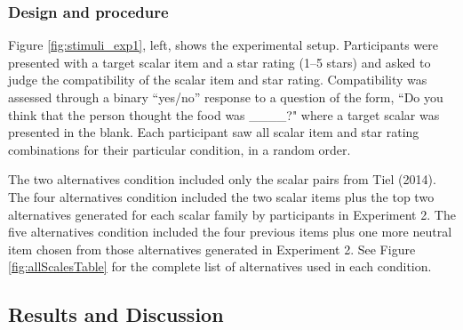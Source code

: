 \documentclass[10pt, letterpaper]{article}
\begin{document}
\subsubsection{Design and procedure}\label{design-and-procedure}

Figure \ref{fig:stimuli_exp1}, left, shows the experimental setup.
Participants were presented with a target scalar item and a star rating
(1--5 stars) and asked to judge the compatibility of the scalar item and
star rating. Compatibility was assessed through a binary ``yes/no''
response to a question of the form, ``Do you think that the person
thought the food was \_\_\_\_?" where a target scalar was presented in
the blank. Each participant saw all scalar item and star rating
combinations for their particular condition, in a random order.

The two alternatives condition included only the scalar pairs from Tiel
(2014). The four alternatives condition included the two scalar items
plus the top two alternatives generated for each scalar family by
participants in Experiment 2. The five alternatives condition included
the four previous items plus one more neutral item chosen from those
alternatives generated in Experiment 2. See Figure
\ref{fig:allScalesTable} for the complete list of alternatives used in
each condition.

\subsection{Results and Discussion}\label{results-and-discussion}
\end{document}
